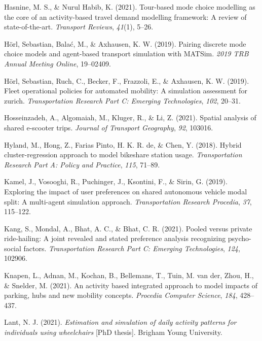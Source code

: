 \documentclass[fancy, masters]{byuthesis}
\newlength{\cslhangindent}
\newlength{\cslentryspacingunit} %
\newenvironment{CSLReferences}[2] %
 {%
  \setlength{\parindent}{0pt}
  \ifodd #1
  \let\oldpar\par
  \def\par{\hangindent=\cslhangindent\oldpar}
  \fi
  \setlength{\parskip}{#2\cslentryspacingunit}
 }%
 {}
\begin{document}
\begin{CSLReferences}{1}{0}
\leavevmode{}%
Hasnine, M. S., \& Nurul Habib, K. (2021). Tour-based mode choice modelling as the core of an activity-based travel demand modelling framework: A review of state-of-the-art. \emph{Transport Reviews}, \emph{41}(1), 5--26.

\leavevmode{}%
Hörl, Sebastian, Balać, M., \& Axhausen, K. W. (2019). Pairing discrete mode choice models and agent-based transport simulation with MATSim. \emph{2019 TRB Annual Meeting Online}, 19--02409.

\leavevmode{}%
Hörl, Sebastian, Ruch, C., Becker, F., Frazzoli, E., \& Axhausen, K. W. (2019). Fleet operational policies for automated mobility: A simulation assessment for zurich. \emph{Transportation Research Part C: Emerging Technologies}, \emph{102}, 20--31.

\leavevmode{}%
Hosseinzadeh, A., Algomaiah, M., Kluger, R., \& Li, Z. (2021). Spatial analysis of shared e-scooter trips. \emph{Journal of Transport Geography}, \emph{92}, 103016.

\leavevmode{}%
Hyland, M., Hong, Z., Farias Pinto, H. K. R. de, \& Chen, Y. (2018). Hybrid cluster-regression approach to model bikeshare station usage. \emph{Transportation Research Part A: Policy and Practice}, \emph{115}, 71--89.

\leavevmode{}%
Kamel, J., Vosooghi, R., Puchinger, J., Ksontini, F., \& Sirin, G. (2019). Exploring the impact of user preferences on shared autonomous vehicle modal split: A multi-agent simulation approach. \emph{Transportation Research Procedia}, \emph{37}, 115--122.

\leavevmode{}%
Kang, S., Mondal, A., Bhat, A. C., \& Bhat, C. R. (2021). Pooled versus private ride-hailing: A joint revealed and stated preference analysis recognizing psycho-social factors. \emph{Transportation Research Part C: Emerging Technologies}, \emph{124}, 102906.

\leavevmode{}%
Knapen, L., Adnan, M., Kochan, B., Bellemans, T., Tuin, M. van der, Zhou, H., \& Snelder, M. (2021). An activity based integrated approach to model impacts of parking, hubs and new mobility concepts. \emph{Procedia Computer Science}, \emph{184}, 428--437.

\leavevmode{}%
Lant, N. J. (2021). \emph{Estimation and simulation of daily activity patterns for individuals using wheelchairs} {[}PhD thesis{]}. Brigham Young University.


\end{CSLReferences}
\end{document}

